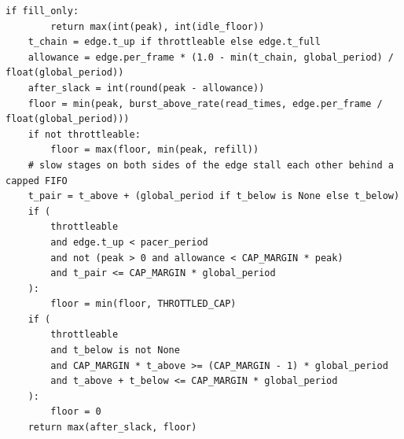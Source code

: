 \documentclass[10pt,a4paper]{article}
\begin{document}
\begin{lstlisting}[firstnumber=826,title={\texttt{src/finn/transformation/fpgadataflow/derive\_characteristic.py}, lines 826--850}]
    if fill_only:
        return max(int(peak), int(idle_floor))
    t_chain = edge.t_up if throttleable else edge.t_full
    allowance = edge.per_frame * (1.0 - min(t_chain, global_period) / float(global_period))
    after_slack = int(round(peak - allowance))
    floor = min(peak, burst_above_rate(read_times, edge.per_frame / float(global_period)))
    if not throttleable:
        floor = max(floor, min(peak, refill))
    # slow stages on both sides of the edge stall each other behind a capped FIFO
    t_pair = t_above + (global_period if t_below is None else t_below)
    if (
        throttleable
        and edge.t_up < pacer_period
        and not (peak > 0 and allowance < CAP_MARGIN * peak)
        and t_pair <= CAP_MARGIN * global_period
    ):
        floor = min(floor, THROTTLED_CAP)
    if (
        throttleable
        and t_below is not None
        and CAP_MARGIN * t_above >= (CAP_MARGIN - 1) * global_period
        and t_above + t_below <= CAP_MARGIN * global_period
    ):
        floor = 0
    return max(after_slack, floor)
\end{lstlisting}
\end{document}
